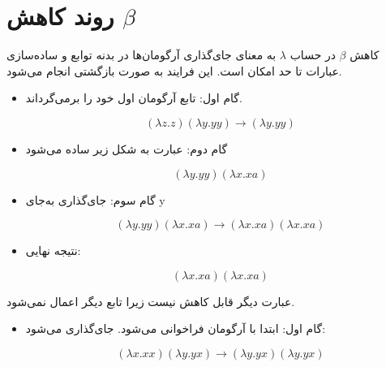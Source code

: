 \documentclass[11pt, a4paper, oneside]{article}
\newcounter{itemadded}
\let\LaTeXStandardEnumerateBegin\enumerate
\let\LaTeXStandardEnumerateEnd\endenumerate
\renewenvironment{enumerate}{%
	\LaTeXStandardEnumerateBegin%
	\setcounter{itemadded}{0}
}{%
	\LaTeXStandardEnumerateEnd%
}%
\begin{document}
	\section{روند کاهش $\beta$}
	
		کاهش $\beta$ در حساب $\lambda$ به معنای جای‌گذاری آرگومان‌ها در بدنه توابع و ساده‌سازی عبارات تا حد امکان است. این فرایند به صورت بازگشتی انجام می‌شود.
		
		\begin{enumerate}
			
			\item {}
			
			\begin{itemize}
				
				\item {\large گام اول}: تابع  آرگومان اول خود را برمی‌گرداند.
				
				\[
				(\lambda z.z)(\lambda y.yy) \rightarrow (\lambda y.yy)
				\]
				
				\item {\large گام دوم}: عبارت به شکل زیر ساده می‌شود
				
				\[
				(\lambda y.yy)(\lambda x.xa)
				\]
				
				\item {\large گام سوم}: جای‌گذاری  به‌جای y
				
				\[
				(\lambda y.yy)(\lambda x.xa) \rightarrow (\lambda x.xa)(\lambda x.xa)
				\]
				
				\item {\large نتیجه نهایی}:
				
				\[
				(\lambda x.xa)(\lambda x.xa)
				\]
				

				
			\end{itemize}
			
			عبارت دیگر قابل کاهش نیست زیرا تابع دیگر اعمال نمی‌شود.
			
			
			\item {}
			
			\begin{itemize}
				
				\item {\large گام اول}: ابتدا  با آرگومان  فراخوانی می‌شود.  جای‌گذاری می‌شود:
				
				\[
				(\lambda x.xx)(\lambda y.yx) \rightarrow (\lambda y.yx)(\lambda y.yx)
				\]
				

\end{itemize}
\end{enumerate}
\end{document}
